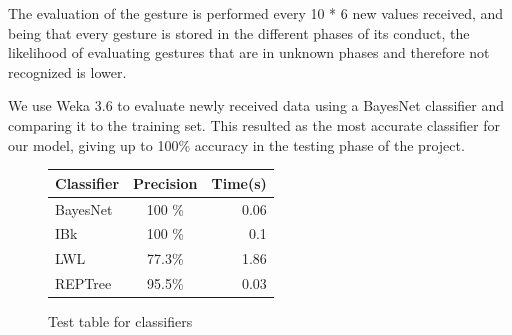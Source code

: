 The evaluation of the gesture is performed every 10 * 6 new values received,
 and being that every gesture is stored in the different phases of its conduct,
  the likelihood of evaluating gestures that are in unknown phases and therefore not recognized is lower.

We use Weka 3.6 to evaluate newly received data using a BayesNet classifier and comparing it to the training set. 
This resulted as the most accurate classifier for our model, giving up to 100\% accuracy in the testing phase of the project.

\begin{figure}[h]
\begin{center}
\begin{tabular}{ l  c r }
Classifier & Precision & Time(s)\\ [0.5ex]
\hline \hline
BayesNet & 100 \%  & 0.06\\ 
IBk & 100 \% & 0.1 \\
LWL & 77.3\%  & 1.86\\
REPTree & 95.5\%  & 0.03 \\ [1ex]
\end{tabular}
\end{center}
\caption{Test table for classifiers}
\label{fig:wekaclass}
\end{figure}



